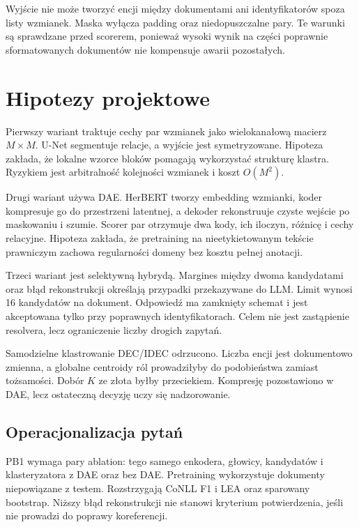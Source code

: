 Wyjście nie może tworzyć encji między dokumentami ani identyfikatorów spoza listy wzmianek. Maska wyłącza padding oraz niedopuszczalne pary. Te warunki są sprawdzane przed scorerem, ponieważ wysoki wynik na części poprawnie sformatowanych dokumentów nie kompensuje awarii pozostałych.

\section{Hipotezy projektowe}
\label{sec:hipotezy-projektowe}

Pierwszy wariant traktuje cechy par wzmianek jako wielokanałową macierz $M\times M$. U-Net segmentuje relacje, a wyjście jest symetryzowane. Hipoteza zakłada, że lokalne wzorce bloków pomagają wykorzystać strukturę klastra. Ryzykiem jest arbitralność kolejności wzmianek i koszt $O(M^2)$.

Drugi wariant używa DAE. HerBERT tworzy embedding wzmianki, koder kompresuje go do przestrzeni latentnej, a dekoder rekonstruuje czyste wejście po maskowaniu i szumie. Scorer par otrzymuje dwa kody, ich iloczyn, różnicę i cechy relacyjne. Hipoteza zakłada, że pretraining na nieetykietowanym tekście prawniczym zachowa regularności domeny bez kosztu pełnej anotacji.

Trzeci wariant jest selektywną hybrydą. Margines między dwoma kandydatami oraz błąd rekonstrukcji określają przypadki przekazywane do LLM. Limit wynosi 16 kandydatów na dokument. Odpowiedź ma zamknięty schemat i jest akceptowana tylko przy poprawnych identyfikatorach. Celem nie jest zastąpienie resolvera, lecz ograniczenie liczby drogich zapytań.

Samodzielne klastrowanie DEC/IDEC odrzucono. Liczba encji jest dokumentowo zmienna, a globalne centroidy ról prowadziłyby do podobieństwa zamiast tożsamości. Dobór $K$ ze złota byłby przeciekiem. Kompresję pozostawiono w DAE, lecz ostateczną decyzję uczy się nadzorowanie.

\subsection{Operacjonalizacja pytań}

PB1 wymaga pary ablation: tego samego enkodera, głowicy, kandydatów i klasteryzatora z DAE oraz bez DAE. Pretraining wykorzystuje dokumenty niepowiązane z testem. Rozstrzygają CoNLL F1 i LEA oraz sparowany bootstrap. Niższy błąd rekonstrukcji nie stanowi kryterium potwierdzenia, jeśli nie prowadzi do poprawy koreferencji.

